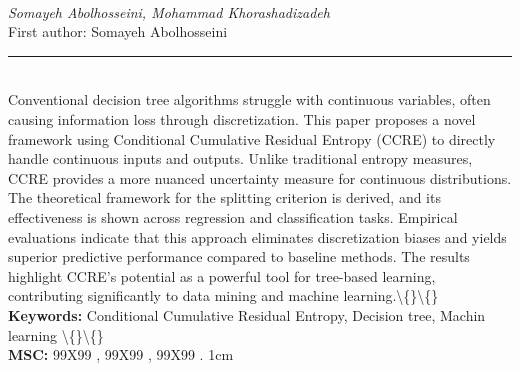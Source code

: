 \documentclass[10pt,twoside]{article}
\begin{document}
\noindent\begin{minipage}[t][\textheight]{\textwidth}
\\[0.35em]
{\itshape Somayeh Abolhosseini, Mohammad Khorashadizadeh}\\[0.2em]
{\footnotesize First author: Somayeh Abolhosseini}\\[0.45em]
\noindent\rule{\textwidth}{0.3pt}\\[0.4em]
{\footnotesize  Conventional decision tree algorithms struggle with continuous variables, often causing information loss through discretization. This paper proposes a novel framework using Conditional Cumulative Residual Entropy (CCRE) to directly handle continuous inputs and outputs. Unlike traditional entropy measures, CCRE provides a more nuanced uncertainty measure for continuous distributions. The theoretical framework for the splitting criterion is derived, and its effectiveness is shown across regression and classification tasks. Empirical evaluations indicate that this approach eliminates discretization biases and yields superior predictive performance compared to baseline methods. The results highlight CCRE's potential as a powerful tool for tree-based learning, contributing significantly to data mining and machine learning.\textbackslash\{\}\textbackslash\{\}}\\[0.4em]
{\footnotesize\bfseries Keywords:} {\footnotesize Conditional Cumulative Residual Entropy, Decision tree, Machin learning \textbackslash\{\}\textbackslash\{\}}\\[0.15em]
{\footnotesize\bfseries MSC:} {\footnotesize 99X99 , 99X99 , 99X99 . 1cm}\\
\vfill
\end{minipage}
\newpage
\end{document}

